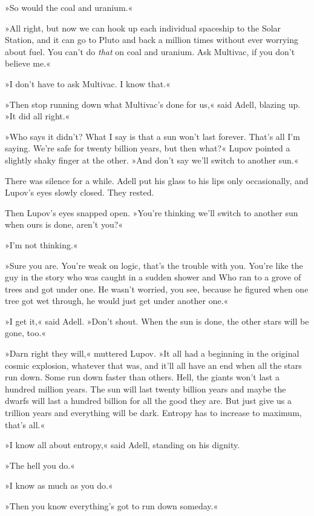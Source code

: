 \documentclass[11pt,twocolumn,paper=a5,pagesize,twoside]{article}
\newcommand{\q}[1]{»#1«}
\begin{document}
\q{So would the coal and uranium.}

\q{All right, but now we can hook up each individual spaceship to the Solar
Station, and it can go to Pluto and back a million times without ever 
worrying about fuel. You can't do \textit{that} on coal and uranium. Ask 
Multivac, if you don't believe me.}

\q{I don't have to ask Multivac. I know that.}

\q{Then stop running down what Multivac's done for us,} said Adell, blazing 
up. \q{It did all right.}

\q{Who says it didn't? What I say is that a sun won't last forever. That's 
all I'm saying. We're safe for twenty billion years, but then what?} Lupov 
pointed a slightly shaky finger at the other. \q{And don't say we'll switch 
to another sun.}

There was silence for a while. Adell put his glass to his lips only 
occasionally, and Lupov's eyes slowly closed. They rested.

Then Lupov's eyes snapped open. \q{You're thinking we'll switch to another 
sun when ours is done, aren't you?}

\q{I'm not thinking.}

\q{Sure you are. You're weak on logic, that's the trouble with you. You're 
like the guy in the story who was caught in a sudden shower and Who ran to 
a grove of trees and got under one. He wasn't worried, you see, because he 
figured when one tree got wet through, he would just get under another one.}

\q{I get it,} said Adell. \q{Don't shout. When the sun is done, the other 
stars will be gone, too.}

\q{Darn right they will,} muttered Lupov. \q{It all had a beginning in the 
original cosmic explosion, whatever that was, and it'll all have an end when 
all the stars run down. Some run down faster than others. Hell, the giants 
won't last a hundred million years. The sun will last twenty billion years 
and maybe the dwarfs will last a hundred billion for all the good they are. 
But just give us a trillion years and everything will be dark. Entropy has 
to increase to maximum, that's all.}

\q{I know all about entropy,} said Adell, standing on his dignity.

\q{The hell you do.}

\q{I know as much as you do.}

\q{Then you know everything's got to run down someday.}
\end{document}
